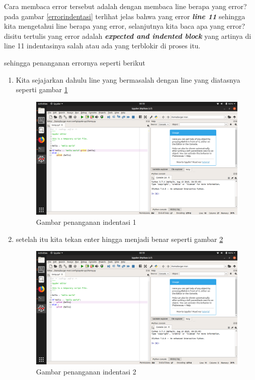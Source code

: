 Cara membaca error tersebut adalah dengan membaca line berapa yang error? pada gambar \ref{errorindentasi} terlihat jelas bahwa yang error \textbf{\textit{line 11}} sehingga kita mengetahui line berapa yang error, selanjutnya kita baca apa yang error? disitu tertulis yang error adalah \textbf{\textit{expected and indented block}} yang artinya di line 11 indentasinya salah atau ada yang terblokir di proses itu.

sehingga penanganan errornya seperti berikut
\begin{enumerate}

\item Kita sejajarkan dahulu line yang bermasalah dengan line yang diatasnya seperti gambar \ref{benerin1}
\begin{figure}[H]
\centering
\includegraphics[width=1\textwidth]{figures/benerin1.png}
\caption{Gambar penanganan indentasi 1}
\label{benerin1}
\end{figure}

\item setelah itu kita tekan enter hingga menjadi benar seperti gambar \ref{benerin2}
\begin{figure}[H]
\centering
\includegraphics[width=1\textwidth]{figures/benerin2.png}
\caption{Gambar penanganan indentasi 2}
\label{benerin2}
\end{figure}

\end{enumerate}
